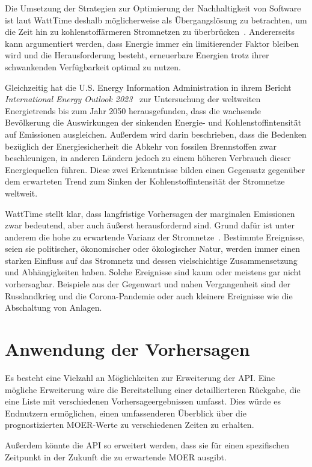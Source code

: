 Die Umsetzung der Strategien zur Optimierung der Nachhaltigkeit von Software ist laut WattTime deshalb möglicherweise als Übergangslösung zu betrachten, um die Zeit hin zu kohlenstoffärmeren Stromnetzen zu überbrücken~\cite{WattTime.12.3.2024}.
Andererseits kann argumentiert werden, dass Energie immer ein limitierender Faktor bleiben wird und die Herausforderung besteht, erneuerbare Energien trotz ihrer schwankenden Verfügbarkeit optimal zu nutzen.

Gleichzeitig hat die U.S. Energy Information Administration in ihrem Bericht \textit{International Energy Outlook 2023}~\cite{U.S.EnergyInformationAdministration.2023} zur Untersuchung der weltweiten Energietrends bis zum Jahr 2050 herausgefunden, dass die wachsende Bevölkerung die Auswirkungen der sinkenden Energie- und Kohlenstoffintensität auf Emissionen ausgleichen.
Außerdem wird darin beschrieben, dass die Bedenken bezüglich der Energiesicherheit die Abkehr von fossilen Brennstoffen zwar beschleunigen, in anderen Ländern jedoch zu einem höheren Verbrauch dieser Energiequellen führen.
Diese zwei Erkenntnisse bilden einen Gegensatz gegenüber dem erwarteten Trend zum Sinken der Kohlenstoffintensität der Stromnetze weltweit.


WattTime stellt klar, dass langfristige Vorhersagen der marginalen Emissionen zwar bedeutend, aber auch äußerst herausfordernd sind.
Grund dafür ist unter anderem die hohe zu erwartende Varianz der Stromnetze~\cite{WattTime.2022}.
Bestimmte Ereignisse, seien sie politischer, ökonomischer oder ökologischer Natur, werden immer einen starken Einfluss auf das Stromnetz und dessen vielschichtige Zusammensetzung und Abhängigkeiten haben.
Solche Ereignisse sind kaum oder meistens gar nicht vorhersagbar.
Beispiele aus der Gegenwart und nahen Vergangenheit sind der Russlandkrieg und die Corona-Pandemie oder auch kleinere Ereignisse wie die Abschaltung von Anlagen.

\section{Anwendung der Vorhersagen}
Es besteht eine Vielzahl an Möglichkeiten zur Erweiterung der \ac{API}.
Eine mögliche Erweiterung wäre die Bereitstellung einer detaillierteren Rückgabe, die eine Liste mit verschiedenen Vorhersageergebnissen umfasst.
Dies würde es Endnutzern ermöglichen, einen umfassenderen Überblick über die prognostizierten \ac{MOER}-Werte zu verschiedenen Zeiten zu erhalten.

Außerdem könnte die \ac{API} so erweitert werden, dass sie für einen spezifischen Zeitpunkt in der Zukunft die zu erwartende \ac{MOER} ausgibt.

